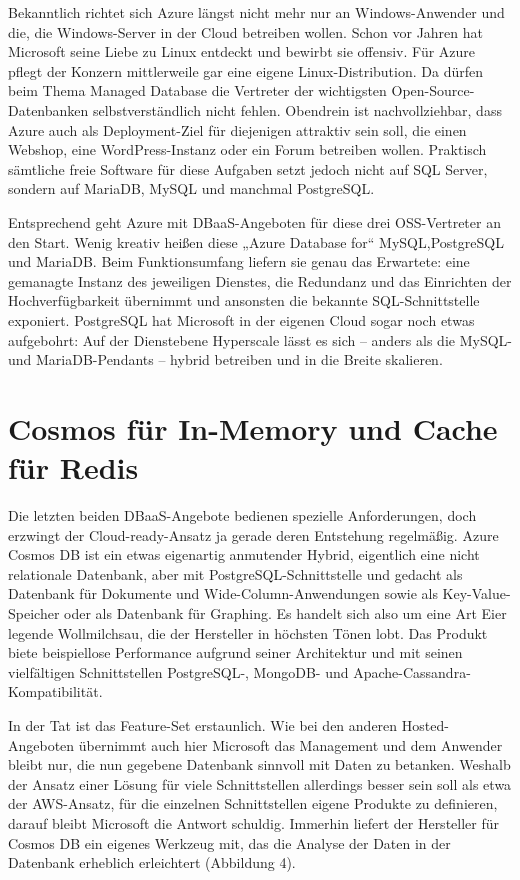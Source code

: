 Bekanntlich richtet sich Azure längst nicht mehr nur an Windows-Anwender und die, die Windows-Server in der Cloud betreiben wollen. Schon vor Jahren hat Microsoft seine Liebe zu Linux entdeckt und bewirbt sie offensiv. Für Azure pflegt der Konzern mittlerweile gar eine eigene Linux-Distribution. Da dürfen beim Thema Managed Database die Vertreter der wichtigsten Open-Source-Datenbanken selbstverständlich nicht fehlen. Obendrein ist nachvollziehbar, dass Azure auch als Deployment-Ziel für diejenigen attraktiv sein soll, die einen Webshop, eine WordPress-Instanz oder ein Forum betreiben wollen. Praktisch sämtliche freie Software für diese Aufgaben setzt jedoch nicht auf SQL Server, sondern auf MariaDB, MySQL und manchmal PostgreSQL.

Entsprechend geht Azure mit DBaaS-Angeboten für diese drei OSS-Vertreter an den Start. Wenig kreativ heißen diese „Azure Database for“ MySQL,PostgreSQL und MariaDB. Beim Funktionsumfang liefern sie genau das Erwartete: eine gemanagte Instanz des jeweiligen Dienstes, die Redundanz und das Einrichten der Hochverfügbarkeit übernimmt und ansonsten die bekannte SQL-Schnittstelle exponiert. PostgreSQL hat Microsoft in der eigenen Cloud sogar noch etwas aufgebohrt: Auf der Dienstebene Hyperscale lässt es sich – anders als die MySQL- und MariaDB-Pendants – hybrid betreiben und in die Breite skalieren.

\section{Cosmos für In-Memory und Cache für Redis}

Die letzten beiden DBaaS-Angebote bedienen spezielle Anforderungen, doch erzwingt der Cloud-ready-Ansatz ja gerade deren Entstehung regelmäßig. Azure Cosmos DB ist ein etwas eigenartig anmutender Hybrid, eigentlich eine nicht relationale Datenbank, aber mit PostgreSQL-Schnittstelle und gedacht als Datenbank für Dokumente und Wide-Column-Anwendungen sowie als Key-Value-Speicher oder als Datenbank für Graphing. Es handelt sich also um eine Art Eier legende Wollmilchsau, die der Hersteller in höchsten Tönen lobt. Das Produkt biete beispiellose Performance aufgrund seiner Architektur und mit seinen vielfältigen Schnittstellen PostgreSQL-, MongoDB- und Apache-Cassandra-Kompatibilität.

In der Tat ist das Feature-Set erstaunlich. Wie bei den anderen Hosted-Angeboten übernimmt auch hier Microsoft das Management und dem Anwender bleibt nur, die nun gegebene Datenbank sinnvoll mit Daten zu betanken. Weshalb der Ansatz einer Lösung für viele Schnittstellen allerdings besser sein soll als etwa der AWS-Ansatz, für die einzelnen Schnittstellen eigene Produkte zu definieren, darauf bleibt Microsoft die Antwort schuldig. Immerhin liefert der Hersteller für Cosmos DB ein eigenes Werkzeug mit, das die Analyse der Daten in der Datenbank erheblich erleichtert (Abbildung 4).

